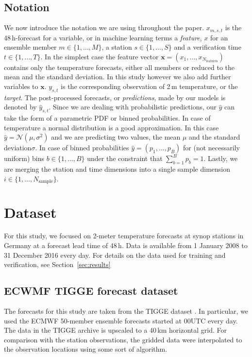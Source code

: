 \documentclass[a4paper,10pt]{scrartcl}
\begin{document}
\subsection{Notation}
We now introduce the notation we are using throughout the paper. $x_{m, s, t}$ is the 48\,h-forecast for a variable, or in machine learning terms a \textit{feature}, $x$ for an ensemble member $m \in \{1, \dots, M \}$, a station $s \in \{ 1, \dots, S\}$ and a verification time $t \in \{ 1, \dots, T\}$. In the simplest case the feature vector $\mathbf{x} = \left( x_1, \dots, x_{N_{\mathrm{features}}} \right)$ contains only the temperature forecasts, either all members or reduced to the mean and the standard deviation. In this study however we also add further variables to $\mathbf{x}$. $y_{s, t}$ is the corresponding observation of 2\,m temperature, or the \textit{target}. The post-processed forecasts, or \textit{predictions}, made by our models is denoted by $\hat{y}_{s, t}$. Since we are dealing with probabilistic predictions, our $\hat{y}$ can take the form of a parametric PDF or binned probabilities. In case of temperature a normal distribution is a good approximation. In this case $\hat{y} = \mathcal{N}(\mu, \sigma^2)$ and we are predicting two values, the mean $\mu$ and the standard deviation$\sigma$. In case of binned probabilities $\hat{y} = ( p_1, \dots, p_B )$ for (not necessarily uniform) bins $b \in \{1, \dots, B\}$ under the constraint that $\sum_{b=1}^B p_b = 1$. Lastly, we are merging the station and time dimensions into a single sample dimension $i \in \{ 1, \dots, N_{\mathrm{sample}} \}$.

\section{Dataset}

For this study, we focused on 2-meter temperature forecasts at synop stations in Germany at a forecast lead time of 48\,h. Data is available from 1 January 2008 to 31 December 2016 every day. For details on the data used for training and verification, see Section~\ref{sec:results}

\subsection{ECWMF TIGGE forecast dataset}
The forecasts for this study are taken from the TIGGE dataset \citep{Bougeault2010}. In particular, we used the ECMWF 50-member ensemble forecasts started at 00UTC every day. The data in the TIGGE archive is upscaled to a 40\,km horizontal grid. For comparison with the station observations, the gridded data were interpolated to the observation locations using some sort of algorithm. 
\end{document}
